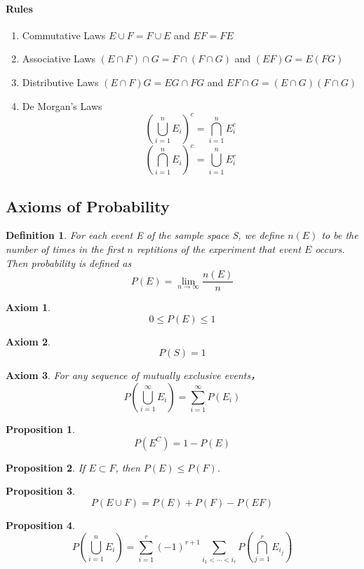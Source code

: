 \documentclass[12pt]{article}
\newtheorem{definition}{Definition}[subsection]
\newtheorem{proposition}{Proposition}[subsection]
\newtheorem{axiom}{Axiom}[subsection]
\begin{document}
    \paragraph{Rules}
    \begin{enumerate}
        \item Commutative Laws $E \cup F = F \cup E$ and $EF = FE$
        \item Associative Laws $(E \cap F) \cap G = F \cap (F \cap G)$ and $(EF)G = E(FG)$
        \item Distributive Laws $(E \cap F)G = EG \cap FG$ and $EF \cap G = (E \cap G)(F \cap G)$
        \item De Morgan's Laws
        \[(\bigcup^n_{i=1}E_i)^c = \bigcap^n_{i=1}E^c_i\]
        \[(\bigcap^n_{i=1}E_i)^c = \bigcup^n_{i=1}E^c_i\]                        \end{enumerate}
    \subsection{Axioms of Probability}
    \begin{definition}
        For each event E of the sample space S, we define $n(E)$ to be the number of times in the first $n$ reptitions of the experiment that event $E$ occurs. Then probability is defined as
        \begin{equation}
            P(E) = \lim_{n\rightarrow\infty}\frac{n(E)}{n}
        \end{equation}

    \end{definition}
    
    \begin{axiom}
        \[0 \leq P(E) \leq 1\]
    \end{axiom}
    
    \begin{axiom}
        \[P(S) = 1\]
    \end{axiom}
    
    \begin{axiom}For any sequence of mutually exclusive events，
        \[P(\bigcup_{i=1}^\infty E_i) = \sum_{i=1}^\infty P(E_i)\]
    \end{axiom}
    
    \begin{proposition}
        \[P(E^C) = 1 - P(E)\]
    \end{proposition}
    \begin{proposition}
     If $E \subset F$, then $P(E) \leq P(F)$.
    \end{proposition}
    \begin{proposition}
        \[P(E \cup F) = P(E) + P(F) - P(EF)\]
    \end{proposition}
    \begin{proposition}
        \[P(\bigcup_{i=1}^n E_i) = \sum_{i = 1}^r (-1)^{r+1}\sum_{i_1 < \cdots < i_r} P(\bigcap_{j=1}^r E_{i_j})\]
    \end{proposition}
\end{document}
